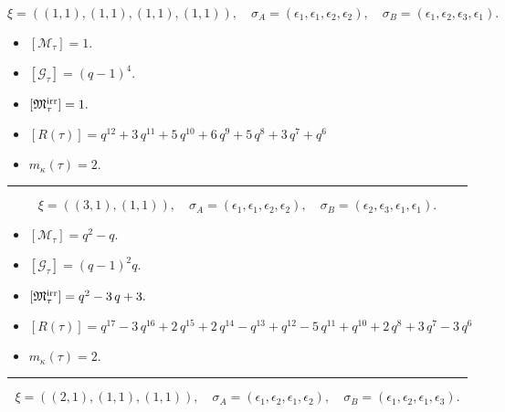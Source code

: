 \documentclass[10pt,a4paper]{amsart}
\begin{document}
$$\xi = ({(1, 1), (1, 1), (1, 1), (1, 1)}),\quad \sigma_A = ({{\epsilon_1}, {\epsilon_1}, {\epsilon_2}, {\epsilon_2}}),\quad \sigma_B = ({{\epsilon_1}, {\epsilon_2}, {\epsilon_3}, {\epsilon_1}}).$$

\begin{itemize}
 \item $[\mathcal{M}_{\tau}] = 1 .$

 \item $[\mathcal{G}_{\tau}] = {\left(q - 1\right)}^{4} .$

 \item $[{\frak M}_{\tau}^{\textrm{irr}}] = 1 .$

 \item $[R(\tau)] = q^{12} + 3 \, q^{11} + 5 \, q^{10} + 6 \, q^{9} + 5 \, q^{8} + 3 \, q^{7} + q^{6} $

 \item $m_{\kappa}(\tau) = 2 .$

 \end{itemize}
\noindent\rule{8cm}{0.4pt}

$$\xi = ({(3, 1)}, {(1, 1)}),\quad \sigma_A = ({{\epsilon_1, \epsilon_1, \epsilon_2}}, {{\epsilon_2}}),\quad \sigma_B = ({{\epsilon_2, \epsilon_3, \epsilon_1}}, {{\epsilon_1}}).$$

\begin{itemize}
 \item $[\mathcal{M}_{\tau}] = q^{2} - q .$

 \item $[\mathcal{G}_{\tau}] = {\left(q - 1\right)}^{2} q .$

 \item $[{\frak M}_{\tau}^{\textrm{irr}}] = q^{2} - 3 \, q + 3 .$

 \item $[R(\tau)] = q^{17} - 3 \, q^{16} + 2 \, q^{15} + 2 \, q^{14} - q^{13} + q^{12} - 5 \, q^{11} + q^{10} + 2 \, q^{8} + 3 \, q^{7} - 3 \, q^{6} $

 \item $m_{\kappa}(\tau) = 2 .$

 \end{itemize}
\noindent\rule{8cm}{0.4pt}

$$\xi = ({(2, 1), (1, 1)}, {(1, 1)}),\quad \sigma_A = ({{\epsilon_1, \epsilon_2}, {\epsilon_1}}, {{\epsilon_2}}),\quad \sigma_B = ({{\epsilon_1, \epsilon_2}, {\epsilon_1}}, {{\epsilon_3}}).$$
\end{document}
